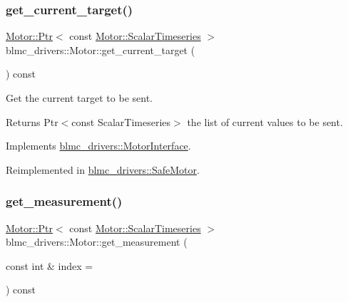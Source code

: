 \subsubsection{\texorpdfstring{get\+\_\+current\+\_\+target()}{get\_current\_target()}}
{\footnotesize\ttfamily \hyperlink{classblmc__drivers_1_1MotorInterface_ae31f230b9da3674a05543023c90b124c}{Motor\+::\+Ptr}$<$ const \hyperlink{classblmc__drivers_1_1MotorInterface_a49b8fc916b9f9debbd7b0988463db5cd}{Motor\+::\+Scalar\+Timeseries} $>$ blmc\+\_\+drivers\+::\+Motor\+::get\+\_\+current\+\_\+target (\begin{DoxyParamCaption}{ }\end{DoxyParamCaption}) const\hspace{0.3cm}{\ttfamily [virtual]}}



Get the current target to be sent. 

\begin{DoxyReturn}{Returns}
Ptr$<$const Scalar\+Timeseries$>$ the list of current values to be sent. 
\end{DoxyReturn}


Implements \hyperlink{classblmc__drivers_1_1MotorInterface_a167ffe5df0412b9abcac9a93861e58d2}{blmc\+\_\+drivers\+::\+Motor\+Interface}.



Reimplemented in \hyperlink{classblmc__drivers_1_1SafeMotor_ae40e4c51272c46f037ea0ba393b2033e}{blmc\+\_\+drivers\+::\+Safe\+Motor}.

\mbox{\label{classblmc__drivers_1_1Motor_a0ff1a1b5eb5da4791cc27879e761eb22}} 
\subsubsection{\texorpdfstring{get\+\_\+measurement()}{get\_measurement()}}
{\footnotesize\ttfamily \hyperlink{classblmc__drivers_1_1MotorInterface_ae31f230b9da3674a05543023c90b124c}{Motor\+::\+Ptr}$<$ const \hyperlink{classblmc__drivers_1_1MotorInterface_a49b8fc916b9f9debbd7b0988463db5cd}{Motor\+::\+Scalar\+Timeseries} $>$ blmc\+\_\+drivers\+::\+Motor\+::get\+\_\+measurement (\begin{DoxyParamCaption}\item[{const int \&}]{index = {} }\end{DoxyParamCaption}) const\hspace{0.3cm}{\ttfamily [virtual]}}



